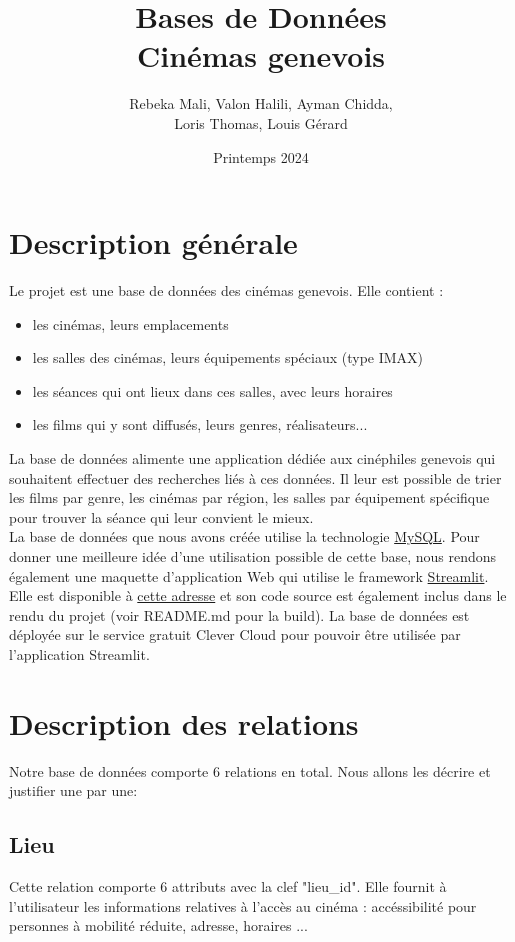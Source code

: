 \documentclass[12pt]{article}
\title{Bases de Données \\ Cinémas genevois}
\author{Rebeka Mali, Valon Halili, Ayman Chidda,\\ Loris Thomas, Louis Gérard}
\date{Printemps 2024}
\begin{document}
\maketitle
\pagebreak
\tableofcontents
\pagebreak
\section{Description générale}
Le projet est une base de données des cinémas genevois. Elle contient : 
\begin{itemize}
    \item les cinémas, leurs emplacements
    \item les salles des cinémas, leurs équipements spéciaux (type IMAX)
    \item les séances qui ont lieux dans ces salles, avec leurs horaires
    \item les films qui y sont diffusés, leurs genres, réalisateurs...
\end{itemize}
La base de données alimente une application dédiée aux cinéphiles genevois qui souhaitent
effectuer des recherches liés à ces données. Il leur est possible de trier les films par genre,
les cinémas par région, les salles par équipement spécifique pour trouver la séance qui leur convient le mieux. \\
La base de données que nous avons créée utilise la technologie \href{https://www.mysql.com/}{MySQL}. Pour donner une meilleure
idée d'une utilisation possible de cette base, nous rendons également une maquette d'application Web qui utilise le framework
\href{https://streamlit.io/}{Streamlit}. Elle est disponible à \href{https://bddg7unige.streamlit.app/}{cette adresse} et son code source
est également inclus dans le rendu du projet (voir README.md pour la build). La base de données est déployée
sur le service gratuit Clever Cloud pour pouvoir être utilisée par l'application Streamlit.
\pagebreak
\section{Description des relations}
Notre base de données comporte 6 relations en total. Nous allons les décrire et justifier une par une: 
\subsection{Lieu}
Cette relation comporte 6 attributs avec la clef "lieu{\_}id". Elle fournit à l'utilisateur les informations
relatives à l'accès au cinéma : accéssibilité pour personnes à mobilité réduite, adresse, horaires ...
\end{document}

